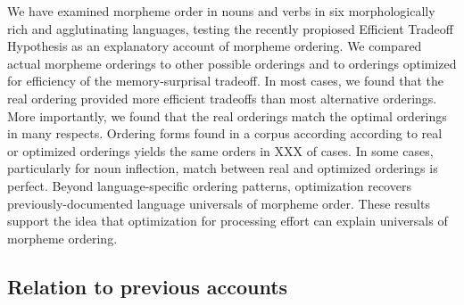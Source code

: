 \documentclass[11pt,letterpaper]{article}
\newcommand{\citep}{\parencite}
\begin{document}
We have examined morpheme order in nouns and verbs in six morphologically rich and agglutinating languages, testing the recently propiosed Efficient Tradeoff Hypothesis \citep{hahn2020modeling} as an explanatory account of morpheme ordering.
We compared actual morpheme orderings to other possible orderings and to orderings optimized for efficiency of the memory-surprisal tradeoff.
In most cases, we found that the real ordering provided more efficient tradeoffs than most alternative orderings.
More importantly, we found that the real orderings match the optimal orderings in many respects.
Ordering forms found in a corpus according according to real or optimized orderings yields the same orders in XXX of cases.
In some cases, particularly for noun inflection, match between real and optimized orderings is perfect.
Beyond language-specific ordering patterns, optimization recovers previously-documented language universals of morpheme order.
These results support the idea that optimization for processing effort can explain universals of morpheme ordering.





\subsection{Relation to previous accounts}


\end{document}
